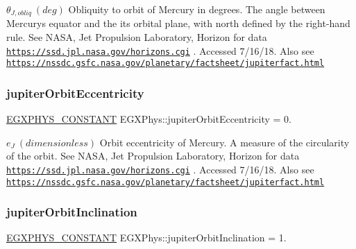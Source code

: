 $ \theta_{J,obliq} \ (deg)$ Obliquity to orbit of Mercury in degrees. The angle between Mercury\textquotesingle{}s equator and the it\textquotesingle{}s orbital plane, with north defined by the right-\/hand rule. See N\+A\+SA, Jet Propulsion Laboratory, Horizon for data \href{https://ssd.jpl.nasa.gov/horizons.cgi}{\tt https\+://ssd.\+jpl.\+nasa.\+gov/horizons.\+cgi} . Accessed 7/16/18. Also see \href{https://nssdc.gsfc.nasa.gov/planetary/factsheet/jupiterfact.html}{\tt https\+://nssdc.\+gsfc.\+nasa.\+gov/planetary/factsheet/jupiterfact.\+html} \mbox{\label{group___e_g_x_phys-_constants-_astrophysics-_solar_system-_jupiter-_orbit_gac92e819ec6b74b0db751948b503ae776}} 
\subsubsection{\texorpdfstring{jupiter\+Orbit\+Eccentricity}{jupiterOrbitEccentricity}}
{\footnotesize\ttfamily \mbox{\hyperlink{group___e_g_x_phys-_constants-_macros_ga76980d288494ce1714c9ac68a95ba702}{E\+G\+X\+P\+H\+Y\+S\+\_\+\+C\+O\+N\+S\+T\+A\+NT}} E\+G\+X\+Phys\+::jupiter\+Orbit\+Eccentricity = 0.}

$ e_{J} \ (dimensionless)$ Orbit eccentricity of Mercury. A measure of the circularity of the orbit. See N\+A\+SA, Jet Propulsion Laboratory, Horizon for data \href{https://ssd.jpl.nasa.gov/horizons.cgi}{\tt https\+://ssd.\+jpl.\+nasa.\+gov/horizons.\+cgi} . Accessed 7/16/18. Also see \href{https://nssdc.gsfc.nasa.gov/planetary/factsheet/jupiterfact.html}{\tt https\+://nssdc.\+gsfc.\+nasa.\+gov/planetary/factsheet/jupiterfact.\+html} \mbox{\label{group___e_g_x_phys-_constants-_astrophysics-_solar_system-_jupiter-_orbit_ga547b86c72473737c6c41220973a5450b}} 
\subsubsection{\texorpdfstring{jupiter\+Orbit\+Inclination}{jupiterOrbitInclination}}
{\footnotesize\ttfamily \mbox{\hyperlink{group___e_g_x_phys-_constants-_macros_ga76980d288494ce1714c9ac68a95ba702}{E\+G\+X\+P\+H\+Y\+S\+\_\+\+C\+O\+N\+S\+T\+A\+NT}} E\+G\+X\+Phys\+::jupiter\+Orbit\+Inclination = 1.}

